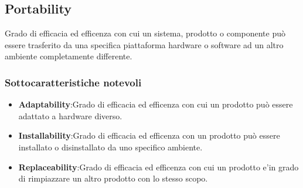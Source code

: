 \subsection{Portability}
Grado di efficacia ed efficenza con cui un sistema, prodotto o componente può essere trasferito da una specifica piattaforma hardware o software ad un altro ambiente completamente differente.
\subsubsection{Sottocaratteristiche notevoli}
\begin{itemize}
	\item{\textbf{Adaptability}}:Grado di efficacia ed efficenza con cui un prodotto può essere adattato a hardware diverso.
	\item{\textbf{Installability}}:Grado di efficacia ed efficenza con un prodotto può essere installato o disinstallato da uno specifico ambiente.
	\item{\textbf{Replaceability}}:Grado di efficacia ed efficenza con cui un prodotto e'in grado di rimpiazzare un altro prodotto con lo stesso scopo.
\end{itemize}
\pagebreak